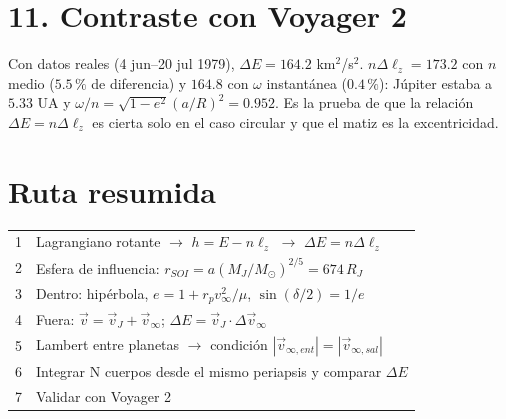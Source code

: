 \documentclass[11pt,letterpaper]{article}
\newcommand{\vinf}{v_\infty}\newcommand{\RJ}{R_J}
\begin{document}
\section*{11. Contraste con Voyager 2}
Con datos reales (4 jun--20 jul 1979), $\Delta E=164.2$ km$^2$/s$^2$. $n\Delta\ell_z=173.2$ con $n$ medio ($5.5\,\%$ de diferencia) y $164.8$ con $\omega$ instantánea ($0.4\,\%$): Júpiter estaba a $5.33$ UA y $\omega/n=\sqrt{1-e^2}(a/R)^2=0.952$. Es la prueba de que la relación $\Delta E=n\Delta\ell_z$ es cierta solo en el caso circular y que el matiz es la excentricidad.

\section*{Ruta resumida}
\begin{center}
\begin{tabular}{rl}
1 & Lagrangiano rotante $\to$ $h=E-n\ell_z$ $\to$ $\Delta E=n\Delta\ell_z$\\
2 & Esfera de influencia: $r_{SOI}=a(M_J/M_\odot)^{2/5}=674\,\RJ$\\
3 & Dentro: hipérbola, $e=1+r_p\vinf^2/\mu$, $\sin(\delta/2)=1/e$\\
4 & Fuera: $\vec v=\vec v_J+\vec v_\infty$; $\Delta E=\vec v_J\cdot\Delta\vec v_\infty$\\
5 & Lambert entre planetas $\to$ condición $|\vec v_{\infty,ent}|=|\vec v_{\infty,sal}|$\\
6 & Integrar N cuerpos desde el mismo periapsis y comparar $\Delta E$\\
7 & Validar con Voyager 2\\
\end{tabular}
\end{center}
\end{document}
